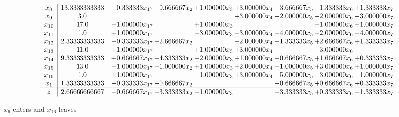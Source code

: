 \documentclass[10pt]{article}
\begin{document}
 \[\begin{array}{c| c c@{\hskip 2pt} c@{\hskip 2pt} c@{\hskip 2pt} c@{\hskip 2pt} c@{\hskip 2pt} c@{\hskip 2pt} c@{\hskip 2pt} }
 x_{8}   &  13.3333333333 & -0.333333 x_{17} & -0.666667 x_{2} & + 1.000000 x_{3} & + 3.000000 x_{4} & -3.666667 x_{5} & -1.333333 x_{6} & + 1.333333 x_{7}\\
 x_{9}   &  3.0  &    &    &   & + 3.000000 x_{4} & + 2.000000 x_{5} & -2.000000 x_{6} & -3.000000 x_{7}\\
 x_{10}   &  17.0 & -1.000000 x_{17} &   & + 1.000000 x_{3} &    &   & -1.000000 x_{6} & -1.000000 x_{7}\\
 x_{11}   &  1.0 & + 1.000000 x_{17} &   & -3.000000 x_{3} & -3.000000 x_{4} & + 4.000000 x_{5} & -2.000000 x_{6} & -4.000000 x_{7}\\
 x_{12}   &  2.33333333333 & -0.333333 x_{17} & -2.666667 x_{2} &   & -2.000000 x_{4} & + 1.333333 x_{5} & + 2.666667 x_{6} & + 1.333333 x_{7}\\
 x_{13}   &  11.0 & + 1.000000 x_{17} &   & + 1.000000 x_{3} & + 3.000000 x_{4} &   & -3.000000 x_{6} &   \\
 x_{14}   &  9.33333333333 & + 0.666667 x_{17} & + 4.333333 x_{2} & -2.000000 x_{3} & + 1.000000 x_{4} & -0.666667 x_{5} & + 1.666667 x_{6} & + 0.333333 x_{7}\\
 x_{15}   &  13.0 & -1.000000 x_{17} & -1.000000 x_{2} & + 1.000000 x_{3} & + 2.000000 x_{4} & -1.000000 x_{5} & + 3.000000 x_{6} & + 1.000000 x_{7}\\
 x_{16}   &  1.0 & + 1.000000 x_{17} &   & -1.000000 x_{3} & + 3.000000 x_{4} & + 5.000000 x_{5} & -3.000000 x_{6} & -1.000000 x_{7}\\
 x_{1}   &  1.33333333333 & -0.333333 x_{17} & -0.666667 x_{2} &    &   & -0.666667 x_{5} & + 0.666667 x_{6} & + 0.333333 x_{7}\\
\hline
z    &  2.66666666667 & -0.666667 x_{17} & -3.333333 x_{2} & -1.000000 x_{3} &   & -3.333333 x_{5} & + 0.333333 x_{6} & -1.333333 x_{7}\\
\end{array}\]


 $ x_{6} $ enters and $ x_{16} $ leaves 
\end{document}
